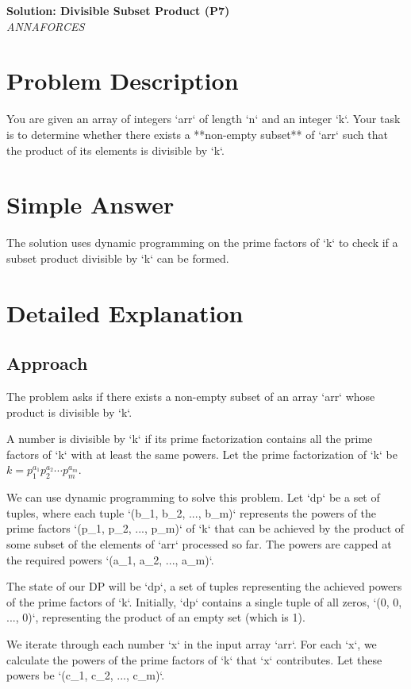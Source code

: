 \documentclass[11pt,a4paper]{article}
\begin{document}
\begin{center}
  {\LARGE \bf Solution: Divisible Subset Product (P7)}\\[6pt]
  {\large \it ANNAFORCES}\
  \vspace{6pt}
\end{center}

\section*{Problem Description}
You are given an array of integers `arr` of length `n` and an integer `k`.
Your task is to determine whether there exists a **non-empty subset** of `arr` such that the product of its elements is divisible by `k`.

\section*{Simple Answer}
The solution uses dynamic programming on the prime factors of `k` to check if a subset product divisible by `k` can be formed.

\section*{Detailed Explanation}
\subsection*{Approach}
The problem asks if there exists a non-empty subset of an array `arr` whose product is divisible by `k`.

A number is divisible by `k` if its prime factorization contains all the prime factors of `k` with at least the same powers. Let the prime factorization of `k` be $k = p_1^{a_1} p_2^{a_2} \cdots p_m^{a_m}$.

We can use dynamic programming to solve this problem. Let `dp` be a set of tuples, where each tuple `(b_1, b_2, ..., b_m)` represents the powers of the prime factors `(p_1, p_2, ..., p_m)` of `k` that can be achieved by the product of some subset of the elements of `arr` processed so far. The powers are capped at the required powers `(a_1, a_2, ..., a_m)`.

The state of our DP will be `dp`, a set of tuples representing the achieved powers of the prime factors of `k`. Initially, `dp` contains a single tuple of all zeros, `(0, 0, ..., 0)`, representing the product of an empty set (which is 1).

We iterate through each number `x` in the input array `arr`. For each `x`, we calculate the powers of the prime factors of `k` that `x` contributes. Let these powers be `(c_1, c_2, ..., c_m)`.
\end{document}

